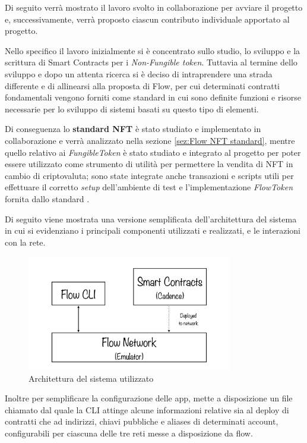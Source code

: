 Di seguito verrà mostrato il lavoro svolto in collaborazione per avviare il progetto e, successivamente, verrà proposto ciascun contributo individuale apportato al progetto.

Nello specifico il lavoro inizialmente si è concentrato sullo studio, lo sviluppo e la scrittura di Smart Contracts per i \textit{Non-Fungible token}. Tuttavia al termine dello sviluppo e dopo un attenta ricerca si è deciso di intraprendere una strada differente e di allinearsi alla proposta di Flow, per cui determinati contratti fondamentali vengono forniti come standard in cui sono definite funzioni e risorse necessarie per lo sviluppo di sistemi basati su questo tipo di elementi. 

Di conseguenza lo \textbf{standard NFT} è stato studiato e implementato in collaborazione e verrà analizzato nella sezione \ref{sez:Flow NFT standard}, mentre quello relativo ai \textit{FungibleToken} è stato studiato e integrato al progetto per poter essere utilizzato come strumento di utilità per permettere la vendita di NFT in cambio di criptovaluta; sono state integrate anche transazioni e scripts utili per effettuare il corretto \textit{setup} dell'ambiente di test e l'implementazione \textit{FlowToken} fornita dallo standard \cite{web:FT-Standard}.

Di seguito viene mostrata una versione semplificata dell'architettura del sistema in cui si evidenziano i principali componenti utilizzati e realizzati, e le interazioni con la rete. 

\begin{figure}[H]
    \centering
    \includegraphics[width=0.8\textwidth]{img/ArchitetturaFlow.png}
    \caption{Architettura del sistema utilizzato}
    \label{fig:flowArch}
\end{figure}

Inoltre per semplificare la configurazione delle app, mette a disposizione un file chiamato  dal quale la CLI attinge alcune informazioni relative sia al deploy di contratti che ad indirizzi, chiavi pubbliche e aliases di determinati account, configurabili per ciascuna delle tre reti messe a disposizione da flow.

